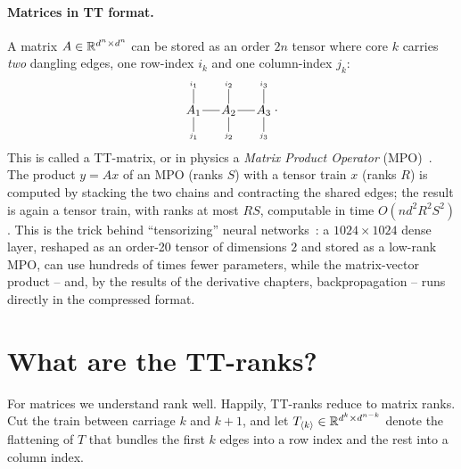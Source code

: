\paragraph{Matrices in TT format.}
A matrix $A \in \mathbb R^{d^n \times d^n}$ can be stored as an order $2n$ tensor where core $k$ carries \emph{two} dangling edges, one row-index $i_k$ and one column-index $j_k$:
\[
   \begin{tikzpicture}[baseline=-.05em, inner sep=1pt]
      \node (A1) at (0,0) {$A_1$};
      \node (A2) at (1,0) {$A_2$};
      \node (A3) at (2,0) {$A_3$};
      \draw (A1) -- (A2);
      \draw (A2) -- (A3);
      \draw (A1) -- ++(0,.6) node[pos=1, above, font=\tiny] {$i_1$};
      \draw (A2) -- ++(0,.6) node[pos=1, above, font=\tiny] {$i_2$};
      \draw (A3) -- ++(0,.6) node[pos=1, above, font=\tiny] {$i_3$};
      \draw (A1) -- ++(0,-.6) node[pos=1, below, font=\tiny] {$j_1$};
      \draw (A2) -- ++(0,-.6) node[pos=1, below, font=\tiny] {$j_2$};
      \draw (A3) -- ++(0,-.6) node[pos=1, below, font=\tiny] {$j_3$};
   \end{tikzpicture}
   \,.
\]
This is called a TT-matrix, or in physics a \emph{Matrix Product Operator} (MPO)~\cite{oseledets_qtt}.
The product $y = Ax$ of an MPO (ranks $S$) with a tensor train $x$ (ranks $R$) is computed by stacking the two chains and contracting the shared edges;
the result is again a tensor train, with ranks at most $RS$, computable in time $O(n d^2 R^2 S^2)$.
This is the trick behind ``tensorizing'' neural networks~\cite{novikov_tensorizing}:
a $1024 \times 1024$ dense layer, reshaped as an order-20 tensor of dimensions $2$ and stored as a low-rank MPO, can use hundreds of times fewer parameters, while the matrix-vector product -- and, by the results of the derivative chapters, backpropagation -- runs directly in the compressed format.

\section{What are the TT-ranks?}

For matrices we understand rank well.
Happily, TT-ranks reduce to matrix ranks.
Cut the train between carriage $k$ and $k+1$, and let
$T_{\langle k\rangle} \in \mathbb R^{d^k \times d^{n-k}}$
denote the flattening of $T$ that bundles the first $k$ edges into a row index and the rest into a column index.

